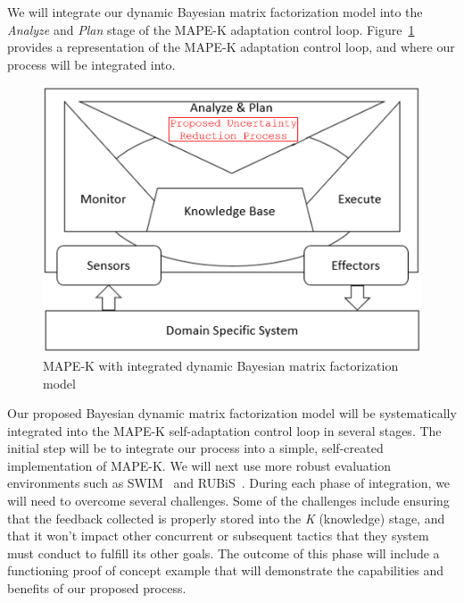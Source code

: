 \documentclass[12pt]{article}
\begin{document}


\vspace{-1mm}

We will integrate our dynamic Bayesian matrix factorization model into the \emph{Analyze} and \emph{Plan} stage of the MAPE-K adaptation control loop. Figure~\ref{fig:exampleMAPEK} provides a representation of the MAPE-K adaptation control loop, and where our process will be integrated into. 
\begin{figure}[h]
	\centering
    \includegraphics[scale=0.28]{images/mapek-uncertaintyreduction-2.png}
    \caption{MAPE-K with integrated dynamic Bayesian matrix factorization model}
    \label{fig:exampleMAPEK}
\end{figure}





Our proposed Bayesian dynamic matrix factorization model will be systematically integrated into the MAPE-K self-adaptation control loop in several stages. The initial step will be to integrate our process into a simple, self-created implementation of MAPE-K. We will next use more robust evaluation environments such as SWIM~\cite{moreno2018swim} and RUBiS~\cite{Rubis_URL}. During each phase of integration, we will need to overcome several challenges. Some of the challenges include ensuring that the feedback collected is properly stored into the \emph{K} (knowledge) stage, and that it won't impact other concurrent or subsequent tactics that they system must conduct to fulfill its other goals. The outcome of this phase will include a functioning proof of concept example that will demonstrate the capabilities and benefits of our proposed process.
\end{document}
